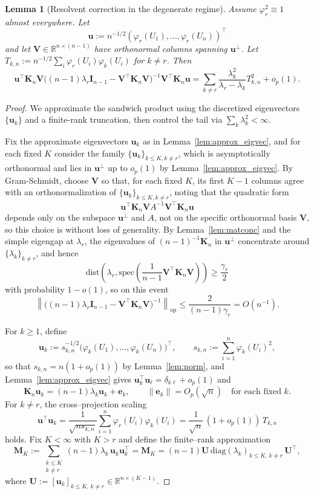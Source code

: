 \documentclass[11pt]{article}
\theoremstyle{plain}
\newtheorem{lemma}[theorem]{Lemma}
\theoremstyle{remark}
\newcommand{\op}{\mathrm{op}}
\begin{document}
\begin{lemma}[Resolvent correction in the degenerate regime]\label{lem:resolvent}
Assume $\varphi_r^2 \equiv 1$ almost everywhere. Let 
\[
\mathbf{u} := n^{-1/2}(\varphi_r(U_1),\dots,\varphi_r(U_n))^\top
\]
and let $\mathbf{V} \in \mathbb{R}^{n \times (n-1)}$ have orthonormal 
columns spanning $\mathbf{u}^\perp$. 
Let $T_{k,n} := n^{-1/2}\sum_i \varphi_r(U_i)\varphi_k(U_i)$ for $k \neq r$. Then
\[
\mathbf{u}^\top \mathbf{K}_n \mathbf{V}\bigl((n-1)\lambda_r \mathbf{I}_{n-1} - \mathbf{V}^\top\mathbf{K}_n\mathbf{V}\bigr)^{-1}\mathbf{V}^\top\mathbf{K}_n \mathbf{u}
=
\sum_{k \neq r}\frac{\lambda_k^2}{\lambda_r - \lambda_k}T_{k,n}^2 + o_p(1).
\]
\end{lemma}

\begin{proof}
We approximate the sandwich product using the discretized eigenvectors $\{\mathbf u_k\}$ and a finite-rank truncation, then control the tail via $\sum_k\lambda_k^2<\infty$.

Fix the approximate eigenvectors $\mathbf u_k$ as in Lemma~\ref{lem:approx_eigvec}, and for each fixed $K$ consider the family $\{\mathbf u_k\}_{k\le K,k\neq r}$, which is asymptotically orthonormal and lies in $\mathbf u^\perp$ up to $o_p(1)$ by Lemma~\ref{lem:approx_eigvec}. By Gram-Schmidt, choose $\mathbf V$ so that, for each fixed $K$, its first $K-1$ columns agree with an orthonormalization of $\{\mathbf u_k\}_{k\le K,k\neq r}$, noting that the quadratic form
\[
\mathbf{u}^\top \mathbf{K}_n \mathbf{V}A^{-1}\mathbf{V}^\top\mathbf{K}_n \mathbf{u}
\]
depends only on the subspace $\mathbf u^\perp$ and $A$, not on the specific orthonormal basis $\mathbf V$, so this choice is without loss of generality. By Lemma~\ref{lem:matconc} and the simple eigengap at $\lambda_r$, the eigenvalues of $(n-1)^{-1}\mathbf K_n$ in $\mathbf u^\perp$ concentrate around $\{\lambda_k\}_{k\neq r}$, and hence
\[
\text{dist}\!\left(\lambda_r,\text{spec}\!\left(\frac{1}{n-1}\mathbf V^\top\mathbf K_n\mathbf V\right)\right)\ge \frac{\gamma_r}{2}
\]
with probability $1-o(1)$, so on this event
\[
\left\|\bigl((n-1)\lambda_r \mathbf{I}_{n-1} - \mathbf{V}^\top\mathbf{K}_n\mathbf{V}\bigr)^{-1}\right\|_{\op} 
\le \frac{2}{(n-1)\gamma_r}
=O(n^{-1}).
\]

For $k\ge1$, define
\[
\mathbf{u}_k:=s_{k,n}^{-1/2}\big(\varphi_k(U_1),\dots,\varphi_k(U_n)\big)^\top,
\qquad
s_{k,n}:=\sum_{i=1}^n\varphi_k(U_i)^2,
\]
so that $s_{k,n}=n(1+o_p(1))$ by Lemma~\ref{lem:norm}, and Lemma~\ref{lem:approx_eigvec} gives $\mathbf u_k^\top\mathbf u_\ell=\delta_{k\ell}+o_p(1)$ and
\[
\mathbf K_n\mathbf u_k=(n-1)\lambda_k\mathbf u_k+\mathbf e_k,
\qquad
\|\mathbf e_k\|=O_p(\sqrt n)
\quad\text{for each fixed }k.
\]
For $k\neq r$, the cross–projection scaling
\[
\mathbf u^\top\mathbf u_k
=
\frac{1}{\sqrt{ns_{k,n}}}\sum_{i=1}^n\varphi_r(U_i)\varphi_k(U_i)
=
\frac{1}{\sqrt n}\,(1+o_p(1))\,T_{k,n}
\]
holds. Fix $K<\infty$ with $K>r$ and define the finite–rank approximation
\[
\mathbf M_K:=\sum_{\substack{k\le K\\ k\neq r}}(n-1)\lambda_k\,\mathbf u_k\mathbf u_k^\top = \mathbf M_K=(n-1)\mathbf U\, \mathrm{diag}(\lambda_k)_{k\le K,\,k\neq r}\, \mathbf U^\top,
\]
where  $\mathbf U:=[\mathbf u_k]_{k\le K,\,k\neq r}\in\mathbb R^{n\times (K-1)}$.


\end{proof}
\end{document}
